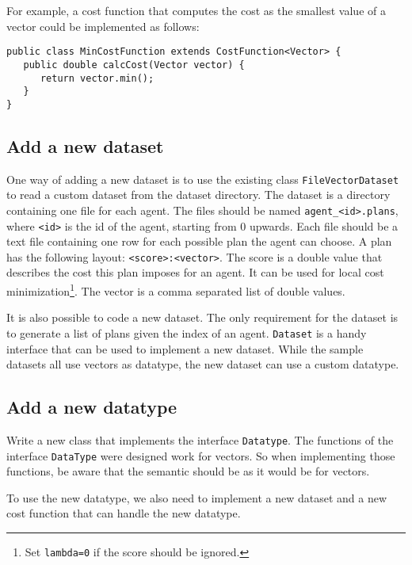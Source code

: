 \documentclass[11pt]{article} %
\newcommand{\code}{\texttt}
\begin{document}
For example, a cost function that computes the cost as the smallest value of a vector could be implemented as follows:
\begin{verbatim}
public class MinCostFunction extends CostFunction<Vector> {
   public double calcCost(Vector vector) {
      return vector.min();
   }
}
\end{verbatim}

\subsection{Add a new dataset} \label{sec:new_dataset}
One way of adding a new dataset is to use the existing class \code{FileVectorDataset} to read a custom dataset from the dataset directory. The dataset is a directory containing one file for each agent. The files should be named \code{agent\_<id>.plans}, where \code{<id>} is the id of the agent, starting from 0 upwards.
Each file should be a text file containing one row for each possible plan the agent can choose. A plan has the following layout: \code{<score>:<vector>}. The score is a double value that describes the cost this plan imposes for an agent. It can be used for local cost minimization\footnote{Set \code{lambda=0} if the score should be ignored.}. The vector is a comma separated list of double values.

It is also possible to code a new dataset. The only requirement for the dataset is to generate a list of plans given the index of an agent. \code{Dataset} is a handy interface that can be used to implement a new dataset. While the sample datasets all use vectors as datatype, the new dataset can use a custom datatype.

\subsection{Add a new datatype}
Write a new class that implements the interface \code{Datatype}. The functions of the interface \code{DataType} were designed work for vectors. So when implementing those functions, be aware that the semantic should be as it would be for vectors.

To use the new datatype, we also need to implement a new dataset and a new cost function that can handle the new datatype.
\end{document}
